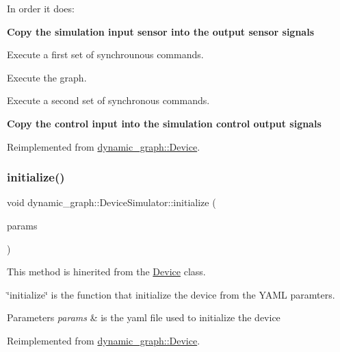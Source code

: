 In order it does\+:
\begin{DoxyItemize}
\item {\bfseries  Copy the simulation input sensor into the output sensor signals}
\item Execute a first set of synchrounous commands.
\item Execute the graph.
\item Execute a second set of synchronous commands.
\item {\bfseries  Copy the control input into the simulation control output signals} 
\end{DoxyItemize}

Reimplemented from \hyperlink{classdynamic__graph_1_1Device_adb596e7acd67089bb4929cf577b3c6ff}{dynamic\+\_\+graph\+::\+Device}.

\mbox{\label{classdynamic__graph_1_1DeviceSimulator_a346995902653feca7707f8c62ab4bf95}} 
\subsubsection{\texorpdfstring{initialize()}{initialize()}}
{\footnotesize\ttfamily void dynamic\+\_\+graph\+::\+Device\+Simulator\+::initialize (\begin{DoxyParamCaption}\item[{const Y\+A\+M\+L\+::\+Node \&}]{params }\end{DoxyParamCaption})\hspace{0.3cm}{\ttfamily [virtual]}}



This method is hinerited from the \hyperlink{classdynamic__graph_1_1Device}{Device} class. 

\char`\"{}initialize\char`\"{} is the function that initialize the device from the Y\+A\+ML paramters. 
\begin{DoxyParams}{Parameters}
{\em params} & is the yaml file used to initialize the device \\
\hline
\end{DoxyParams}


Reimplemented from \hyperlink{classdynamic__graph_1_1Device_af6edd01afac2838c4e336c76caa4338a}{dynamic\+\_\+graph\+::\+Device}.

